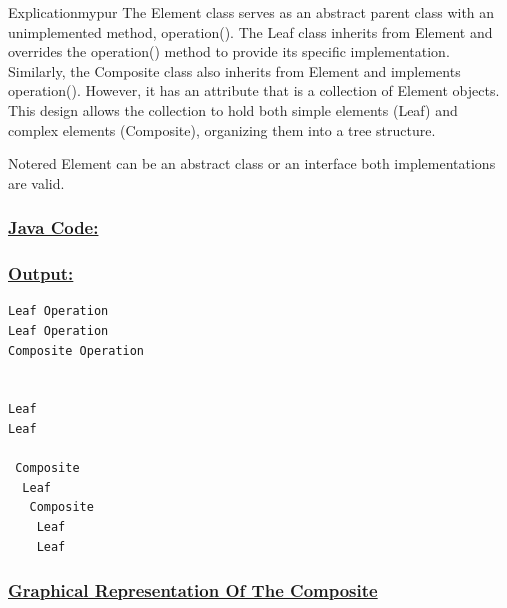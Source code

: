 \begin{prettyBox}{Explication}{mypur}
The Element class serves as an abstract parent class with an unimplemented method, operation().  
The Leaf class inherits from Element and overrides the operation() method to provide its specific implementation.  
Similarly, the Composite class also inherits from Element and implements operation(). However, it has an attribute that is a collection of Element objects.  
This design allows the collection to hold both simple elements (Leaf) and complex elements (Composite), organizing them into a tree structure.
\end{prettyBox}

\vspace{0.25cm}
\begin{prettyBox}{Note}{red}
Element can be an abstract class or an interface both implementations are valid.
\end{prettyBox}

\vspace{0.25cm}
\subsubsection*{\underline{Java Code:}}










\subsubsection*{\underline{Output:}}
\begin{lstlisting}[style=cmd]
Leaf Operation
Leaf Operation
Composite Operation


Leaf
Leaf

 Composite
  Leaf
   Composite
    Leaf
    Leaf
\end{lstlisting}


\subsubsection*{\underline{Graphical Representation Of The Composite}}


